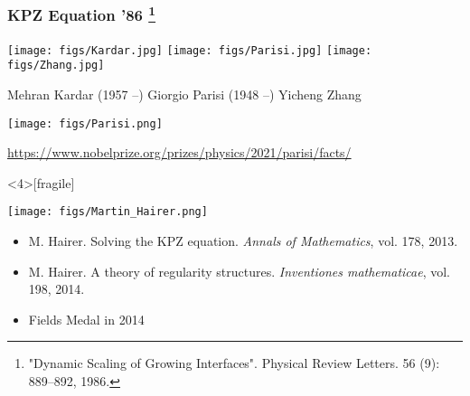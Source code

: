\documentclass[9pt,xcolor=dvipsnames,table]{beamer}
\begin{document}
\begin{frame}[fragile] %
  \frametitle{KPZ Equation '86 \footnote{"Dynamic Scaling of Growing Interfaces". Physical Review
  Letters. 56 (9): 889--892, 1986.}}

  \begin{center}
    \texttt{[image: figs/Kardar.jpg]}
    \texttt{[image: figs/Parisi.jpg]}
    \texttt{[image: figs/Zhang.jpg]}
  \end{center}

  \small
  \quad Mehran Kardar (1957 --) \:\:  Giorgio Parisi (1948 --) \qquad\qquad Yicheng Zhang
\end{frame}
\begin{frame}[fragile] %
 \begin{center}
  \texttt{[image: figs/Parisi.png]}
  \bigskip

  \small
  \url{https://www.nobelprize.org/prizes/physics/2021/parisi/facts/}
 \end{center}
\end{frame}
\begin{frame}<4>[fragile] %
  \begin{minipage}{0.3\textwidth}
  \texttt{[image: figs/Martin\_Hairer.png]}
  \end{minipage}
  \begin{minipage}{0.65\textwidth}
    \pause
    \begin{itemize}
      \small
      \item \textcolor{refcolor}{M. Hairer}. Solving the KPZ equation. {\it Annals of Mathematics}, vol. 178, 2013.
        \bigskip
      \item \textcolor{refcolor}{M. Hairer}. A theory of regularity structures. {\it Inventiones mathematicae}, vol. 198, 2014.
        \bigskip
        \mySeparateLine
        \bigskip
      \item[]
        \begin{center}
          \Large
          Fields Medal in 2014
        \end{center}
    \end{itemize}
  \end{minipage}
\end{frame}
\end{document}
